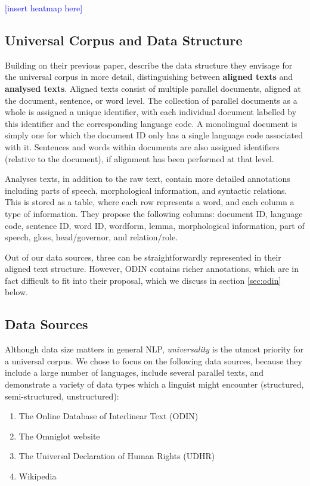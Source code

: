 \textcolor{blue}{[insert heatmap here]}


\subsection{Universal Corpus and Data Structure} \label{sec:structure}

Building on their previous paper,  describe the data structure they envisage for the universal corpus in more detail, distinguishing between \textbf{aligned texts} and \textbf{analysed texts}. Aligned texts consist of multiple parallel documents, aligned at the document, sentence, or word level. The collection of parallel documents as a whole is assigned a unique identifier, with each individual document labelled by this identifier and the corresponding language code.  A monolingual document is simply one for which the document ID only has a single language code associated with it.  Sentences and words within documents are also assigned identifiers (relative to the document), if alignment has been performed at that level.

Analyses texts, in addition to the raw text, contain more detailed annotations including parts of speech, morphological information, and syntactic relations.  This is stored as a table, where each row represents a word, and each column a type of information.  They propose the following columns: document ID, language code, sentence ID, word ID, wordform, lemma, morphological information, part of speech, gloss, head/governor, and relation/role.

Out of our data sources, three can be straightforwardly represented in their aligned text structure.  However, ODIN contains richer annotations, which are in fact difficult to fit into their proposal, which we discuss in section \ref{sec:odin} below.


\subsection{Data Sources} \label{sec:sources}

Although data size matters in general NLP, \emph{universality} is the utmost priority for a universal corpus. We chose to focus on the following data sources, because they include a large number of languages, include several parallel texts, and demonstrate a variety of data types which a linguist might encounter (structured, semi-structured, unstructured):

\begin{enumerate}
\item The Online Database of Interlinear Text (ODIN)
\item The Omniglot website
\item The Universal Declaration of Human Rights (UDHR)
\item Wikipedia
\end{enumerate}


